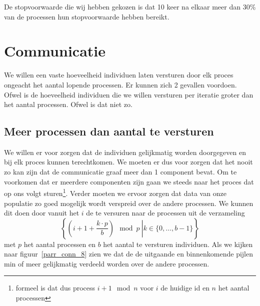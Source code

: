 De stopvoorwaarde die wij hebben gekozen is dat 10 keer na elkaar meer dan 30\% van de processen hun stopvoorwaarde hebben bereikt.

\section{Communicatie}
\label{sub:parCommWay}
We willen een vaste hoeveelheid individuen laten versturen door elk proces ongeacht het aantal lopende processen.  
Er kunnen zich 2 gevallen voordoen. Ofwel is de hoeveelheid individuen die we willen versturen per iteratie groter dan het aantal processen. Ofwel is dat niet zo.
\subsection{Meer processen dan aantal te versturen}
We willen er voor zorgen dat de individuen gelijkmatig worden doorgegeven en bij
elk proces kunnen terechtkomen. We moeten er dus voor zorgen dat het nooit zo kan zijn dat de communicatie graaf meer dan 1 component bevat. Om te voorkomen dat er meerdere componenten zijn gaan we steeds naar het proces dat op ons volgt sturen\footnote{formeel is dat dus process $i+1 \mod n$ voor $i$ de huidige id en $n$ het aantal processen}. Verder moeten we ervoor zorgen dat data van onze populatie zo goed mogelijk wordt verspreid over de andere processen. We kunnen dit doen door vanuit het $i$ de te versuren naar de processen uit de verzameling \[
\left\{\left.\left(i + 1 + \frac{k \cdot p}{b}\right) \mod p  ~ \right\rvert   k \in \{0,\dots,b-1\}\right\}
\] met $p$ het aantal processen en $b$ het aantal te versturen individuen. Als we kijken naar figuur~\ref{parr_conn_8} zien we dat de de uitgaande en binnenkomende pijlen min of meer gelijkmatig verdeeld worden over de andere processen. 

